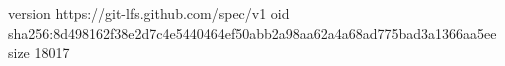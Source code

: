 version https://git-lfs.github.com/spec/v1
oid sha256:8d498162f38e2d7c4e5440464ef50abb2a98aa62a4a68ad775bad3a1366aa5ee
size 18017
